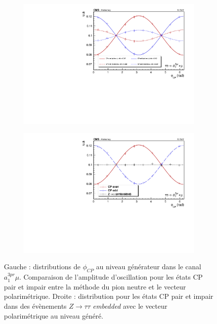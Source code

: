 \begin{figure}[]
  \begin{subfigure}[b]{0.5\linewidth}
    \centering
    \includegraphics[width=\linewidth]{Chapitre6/Images/A1MU/a1mu_pvdpgen.pdf} 
    \caption*{} 
    \vspace{0.5ex}
  \end{subfigure}%
  \begin{subfigure}[b]{0.5\linewidth}
    \centering
    \includegraphics[width=\linewidth]{Chapitre6/Images/A1MU/a1mu_genpv.pdf} 
    \caption*{} 
    \vspace{0.5ex}
  \end{subfigure} 
\caption{Gauche : distributions de $\phi_{CP}$ au niveau générateur dans le canal $a_1^{3pr}\mu$. Comparaison de l'amplitude d'oscillation pour les états CP pair et impair entre la méthode du pion neutre et le vecteur polarimétrique. Droite : distribution pour les états CP pair et impair dans des évènements $Z\to\tau\tau$ \textit{embedded} avec le vecteur polarimétrique au niveau généré.}
\label{a1mugen}
\end{figure}

